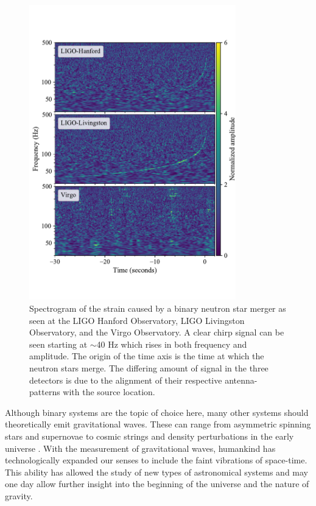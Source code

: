 \documentclass [12pt, proquest]{uwthesis}[2019]
\begin{document}
\begin{figure}
\begin{center}
\includegraphics[width=0.8\textwidth]{GW170817.pdf}
\caption[Spectrogram of the strain caused by a binary neutron star merger]{Spectrogram of the strain caused by a binary neutron star merger as seen at the LIGO Hanford Observatory, LIGO Livingston Observatory, and the Virgo Observatory. \cite{GW170817} A clear chirp signal can be seen starting at $\sim$40 Hz which rises in both frequency and amplitude. The origin of the time axis is the time at which the neutron stars merge. The differing amount of signal in the three detectors is due to the alignment of their respective antenna-patterns with the source location.}
\label{GW170817}
\end{center}
\end{figure}
 
 Although binary systems are the topic of choice here, many other systems should theoretically emit gravitational waves. These can range from asymmetric spinning stars \cite{contGW} and supernovae \cite{SN} to cosmic strings \cite{strings} and density perturbations in the early universe \cite{inflation}. With the measurement of gravitational waves, humankind has technologically expanded our senses to include the faint vibrations of space-time. This ability has allowed the study of new types of astronomical systems and may one day allow further insight into the beginning of the universe and the nature of gravity.
\pagebreak
\end{document}
